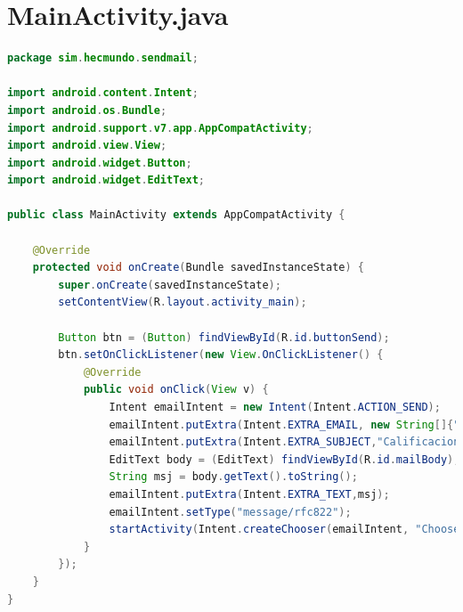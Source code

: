 \documentclass{report}
\begin{document}
\section{MainActivity.java}
\begin{lstlisting}[language=java]
package sim.hecmundo.sendmail;

import android.content.Intent;
import android.os.Bundle;
import android.support.v7.app.AppCompatActivity;
import android.view.View;
import android.widget.Button;
import android.widget.EditText;

public class MainActivity extends AppCompatActivity {

    @Override
    protected void onCreate(Bundle savedInstanceState) {
        super.onCreate(savedInstanceState);
        setContentView(R.layout.activity_main);

        Button btn = (Button) findViewById(R.id.buttonSend);
        btn.setOnClickListener(new View.OnClickListener() {
            @Override
            public void onClick(View v) {
                Intent emailIntent = new Intent(Intent.ACTION_SEND);
                emailIntent.putExtra(Intent.EXTRA_EMAIL, new String[]{"jayrosp@gmail.com"});
                emailIntent.putExtra(Intent.EXTRA_SUBJECT,"Calificaciones SIM");
                EditText body = (EditText) findViewById(R.id.mailBody);
                String msj = body.getText().toString();
                emailIntent.putExtra(Intent.EXTRA_TEXT,msj);
                emailIntent.setType("message/rfc822");
                startActivity(Intent.createChooser(emailIntent, "Choose email client..."));
            }
        });
    }
}
\end{lstlisting}
\end{document}
